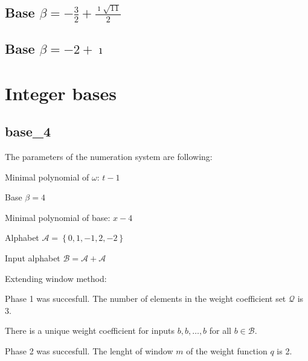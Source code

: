 \subsection{Base $\beta = -\frac{3}{2} + \frac{\imath \sqrt{11}}{2}$}


\subsection{Base $\beta = -2 + \imath$}

\section{Integer bases}
\subsection{ base\_4 }

\label{subsec: base4 }

The parameters of the numeration system are following:

Minimal polynomial of $\omega$: $ t - 1 $

Base $\beta= 4 $

Minimal polynomial of base: $ x - 4 $

Alphabet $\mathcal{A} =\left\{0, 1, -1, 2, -2\right\}$

Input alphabet $\mathcal{B} =\mathcal{A}+ \mathcal{A}$

Extending window method:

Phase 1 was succesfull.
The number of elements in the weight coefficient set $\mathcal{Q}$ is $3$.

There is a unique weight coefficient for inputs $b,b,\dots,b$ for all $b\in\mathcal{B}$.

Phase 2 was succesfull.
The lenght of window $m$ of the weight function $q$ is 2.
